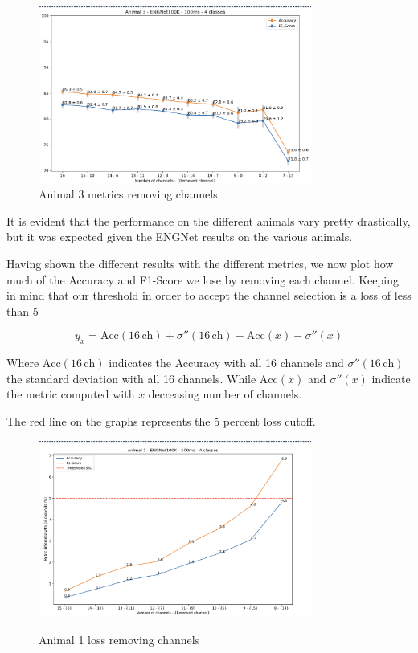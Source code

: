 \documentclass{Configuration_Files/PoliMi3i_thesis}
\begin{document}
\begin{figure}[H]
    \centering
    \includegraphics[width=0.8\textwidth]{Results Matteo/figure4}
    \caption{Animal 3 metrics removing channels}
    \label{figure4}
\end{figure}

It is evident that the performance on the different animals vary pretty drastically, but it was expected given the ENGNet results on the various animals.

Having shown the different results with the different metrics, we now plot how much of the Accuracy and F1-Score we lose by removing each channel.
Keeping in mind that our threshold in order to accept the channel selection is a loss of less than 5%

\[
y_x = \text{Acc}(16 \, \text{ch}) + \sigma''(16 \, \text{ch}) - \text{Acc}(x) - \sigma''(x)
\]

Where $\text{Acc}(16 \, \text{ch})$ indicates the Accuracy with all 16 channels and $\sigma''(16 \, \text{ch})$ the standard deviation with all 16 channels.
While $\text{Acc}(x)$ and $\sigma''(x)$ indicate the metric computed with $x$ decreasing number of channels.

The red line on the graphs represents the 5 percent loss cutoff.

\begin{figure}[H]
    \centering
    \includegraphics[width=0.8\textwidth]{Results Matteo/figure6}
    \label{figure6}
    \caption{Animal 1 loss removing channels}
\end{figure}
\end{document}
